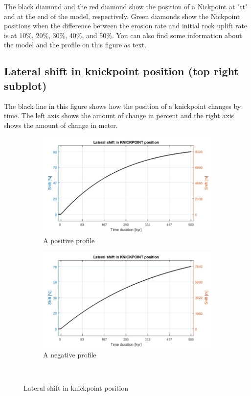 \documentclass[11pt,a4paper,titlepage]{report}
\begin{document}
The black diamond and the red diamond show the position of a Nickpoint at "tt" and at the end of the model, respectively. Green diamonds show the Nickpoint positions when the difference between the erosion rate and initial rock uplift rate is at 10\%, 20\%, 30\%, 40\%, and 50\%. You can also find some information about the model and the profile on this figure as text.


\subsection{Lateral shift in knickpoint position (top right subplot)}
The black line in this figure shows how the position of a knickpoint changes by time. The left axis shows the amount of change in percent and the right axis shows the amount of change in meter.\\

\begin{figure}[H]
    \centering
    \begin{subfigure}[H]{0.45\textwidth}
        \includegraphics[width=\textwidth]{kp_p.jpg}
        \caption{A positive profile}
    \end{subfigure}
    \quad
    \begin{subfigure}[H]{0.45\textwidth}
        \includegraphics[width=\textwidth]{kp_n.jpg}
        \caption{A negative profile}
    \end{subfigure}\\
    \caption[Lateral shift in knickpoint position]{Lateral shift in knickpoint position}
    \label{fig:knickpoint}    
\end{figure}
\end{document}
